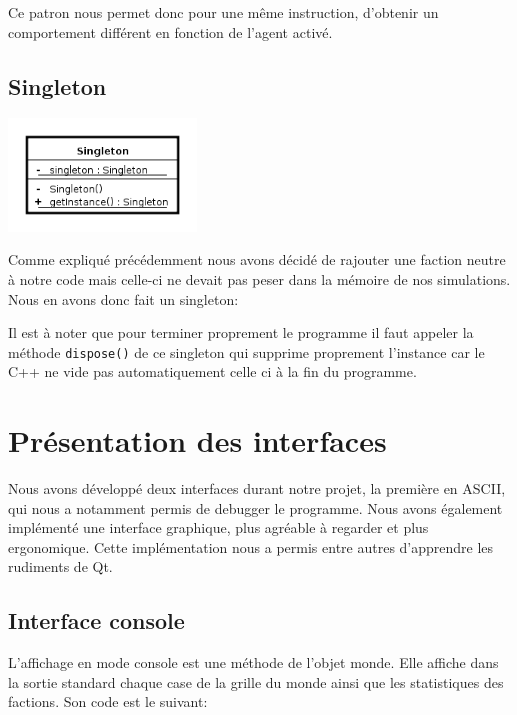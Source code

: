   Ce patron nous permet donc pour une même instruction, d’obtenir un comportement différent en fonction de l’agent activé.

  \subsection{Singleton}

  \begin{center}
    \includegraphics[height=3cm]{images/single.png}
  \end{center}

  Comme expliqué précédemment nous avons décidé de rajouter une faction neutre à notre code mais celle-ci ne devait pas peser dans la mémoire de nos simulations. Nous en avons donc fait un singleton:

  Il est à noter que pour terminer proprement le programme il faut appeler la méthode \texttt{dispose()} de ce singleton qui supprime proprement l’instance car le C++ ne vide pas automatiquement celle ci à la fin du programme.

  \section{Présentation des interfaces}

  Nous avons développé deux interfaces durant notre projet, la première en ASCII, qui nous a notamment permis de debugger le programme. Nous avons également implémenté une interface graphique, plus agréable à regarder et plus ergonomique. Cette implémentation nous a permis entre autres d’apprendre les rudiments de Qt.

  \subsection{Interface console}
  L’affichage en mode console est une méthode de l’objet monde. Elle affiche dans la sortie standard chaque case de la grille du monde ainsi que les statistiques des factions. Son code est le suivant:

